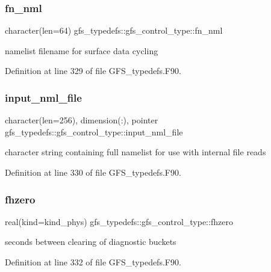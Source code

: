 \subsubsection{fn\+\_\+nml}
{\footnotesize\ttfamily character(len=64) gfs\+\_\+typedefs\+::gfs\+\_\+control\+\_\+type\+::fn\+\_\+nml}



namelist filename for surface data cycling 



Definition at line 329 of file G\+F\+S\+\_\+typedefs.\+F90.

\mbox{\label{structgfs__typedefs_1_1gfs__control__type_a473c70eaca4c4d903898e113aa855f50}} 
\subsubsection{input\+\_\+nml\+\_\+file}
{\footnotesize\ttfamily character(len=256), dimension(\+:), pointer gfs\+\_\+typedefs\+::gfs\+\_\+control\+\_\+type\+::input\+\_\+nml\+\_\+file}



character string containing full namelist for use with internal file reads 



Definition at line 330 of file G\+F\+S\+\_\+typedefs.\+F90.

\mbox{\label{structgfs__typedefs_1_1gfs__control__type_ae55331d95a5ec1b34c7d64f048bee701}} 
\subsubsection{fhzero}
{\footnotesize\ttfamily real(kind=kind\+\_\+phys) gfs\+\_\+typedefs\+::gfs\+\_\+control\+\_\+type\+::fhzero}



seconds between clearing of diagnostic buckets 



Definition at line 332 of file G\+F\+S\+\_\+typedefs.\+F90.

